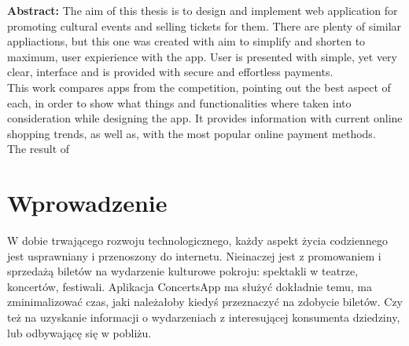 \documentclass[12pt]{article}
\begin{document}
\begin{sloppypar}


\tableofcontents
\newpage

\textbf{Abstract:}
The aim of this thesis is to design and implement web application for promoting cultural events and selling tickets for them. 
There are plenty of similar appliactions, but this one was created with aim to simplify and shorten to maximum, user expierience with the app.
User is presented with simple, yet very clear, interface and is provided with secure and effortless payments. \\
This work compares apps from the competition, pointing out the best aspect of each, in order to show what things and functionalities where taken into 
consideration while designing the app. It provides information with current online shopping trends, as well as,
 with the most popular online payment methods.\\
 The result of 

\section{Wprowadzenie}
{
  W dobie trwającego rozwoju technologicznego, każdy aspekt życia codziennego jest usprawniany i przenoszony
  do internetu. Nieinaczej jest z promowaniem i sprzedażą biletów na wydarzenie kulturowe pokroju:
  spektakli w teatrze, koncertów, festiwali. Aplikacja ConcertsApp ma służyć dokładnie temu,
  ma zminimalizować czas, jaki należałoby kiedyś przeznaczyć na zdobycie biletów. Czy też na uzyskanie
  informacji o wydarzeniach z interesującej konsumenta dziedziny, lub odbywającę się w pobliżu.
}
\end{sloppypar}
\end{document}

